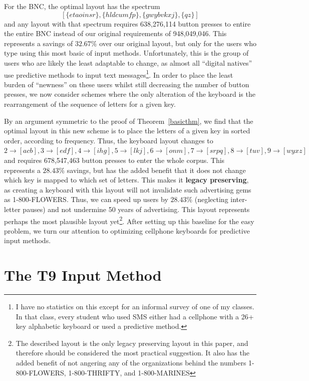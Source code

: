 \documentclass[runningheads]{llncs}
\newcommand{\newword}[1]{{\bf #1}}
\begin{document}
For the BNC, the optimal layout has the spectrum $$[\{etaoinsr\}, \{hldcumfp\},
\{gwybvkxj\}, \{qz\}]$$ and any layout with that spectrum requires 638,276,114
button presses to entire the entire BNC instead of our original requirements of
948,049,046.  This represents a savings of $32.67\%$ over our original layout,
but only for the users who type using this most basic of input methods.
Unfortunately, this is the group of users who are likely the least adaptable to
change, as almost all ``digital natives'' use predictive methods to input text
messages\footnote{I have no statistics on this except for an informal survey of
one of my classes.  In that class, every student who used SMS either had a
cellphone with a 26+ key alphabetic keyboard or used a predictive method.}.  In
order to place the least burden of ``newness'' on these users whilst still
decreasing the number of button presses, we now consider schemes where the only
alteration of the keyboard is the rearrangement of the sequence of letters for
a given key.

By an argument symmetric to the proof of Theorem~\ref{basicthm}, we find that
the optimal layout in this new scheme is to place the letters of a given key in
sorted order, according to frequency.  Thus, the keyboard layout changes to
$2\to[acb], 3\to[edf], 4\to[ihg], 5\to[lkj], 6\to[onm], 7\to[srpq], 8\to[tuv],
9\to[wyxz]$ and requires 678,547,463 button presses to enter the whole corpus.
This represents a $28.43\%$ savings, but has the added benefit that it does not
change which key is mapped to which set of letters.  This makes it
\newword{legacy preserving}, as creating a keyboard with this layout will not
invalidate such advertising gems as 1-800-FLOWERS.  Thus, we can speed up users
by $28.43\%$ (neglecting inter-letter pauses) and not undermine 50 years of
advertising.  This layout represents perhaps the most plausible layout
yet\footnote{The described layout is the only legacy preserving layout in this
paper, and therefore should be considered the most practical suggestion.  It
also has the added benefit of not angering any of the organizations behind the
numbers 1-800-FLOWERS, 1-800-THRIFTY, and 1-800-MARINES}.  After setting up
this baseline for the easy problem, we turn our attention to optimizing
cellphone keyboards for predictive input methods.

\section{The T9 Input Method}
\end{document}
